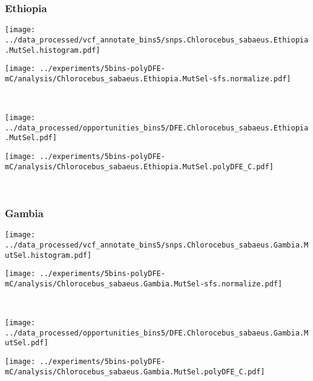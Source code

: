 \subsubsection{Ethiopia}

\begin{minipage}{0.49\linewidth}
    \texttt{[image: ../data\_processed/vcf\_annotate\_bins5/snps.Chlorocebus\_sabaeus.Ethiopia.MutSel.histogram.pdf]}
\end{minipage}
\begin{minipage}{0.49\linewidth}
    \texttt{[image: ../experiments/5bins-polyDFE-mC/analysis/Chlorocebus\_sabaeus.Ethiopia.MutSel-sfs.normalize.pdf]}
\end{minipage}
\\
\begin{minipage}{0.49\linewidth}
    \texttt{[image: ../data\_processed/opportunities\_bins5/DFE.Chlorocebus\_sabaeus.Ethiopia.MutSel.pdf]}
\end{minipage}
\begin{minipage}{0.49\linewidth}
    \texttt{[image: ../experiments/5bins-polyDFE-mC/analysis/Chlorocebus\_sabaeus.Ethiopia.MutSel.polyDFE\_C.pdf]}
\end{minipage}
\\

\subsubsection{Gambia}

\begin{minipage}{0.49\linewidth}
    \texttt{[image: ../data\_processed/vcf\_annotate\_bins5/snps.Chlorocebus\_sabaeus.Gambia.MutSel.histogram.pdf]}
\end{minipage}
\begin{minipage}{0.49\linewidth}
    \texttt{[image: ../experiments/5bins-polyDFE-mC/analysis/Chlorocebus\_sabaeus.Gambia.MutSel-sfs.normalize.pdf]}
\end{minipage}
\\
\begin{minipage}{0.49\linewidth}
    \texttt{[image: ../data\_processed/opportunities\_bins5/DFE.Chlorocebus\_sabaeus.Gambia.MutSel.pdf]}
\end{minipage}
\begin{minipage}{0.49\linewidth}
    \texttt{[image: ../experiments/5bins-polyDFE-mC/analysis/Chlorocebus\_sabaeus.Gambia.MutSel.polyDFE\_C.pdf]}
\end{minipage}
\\

